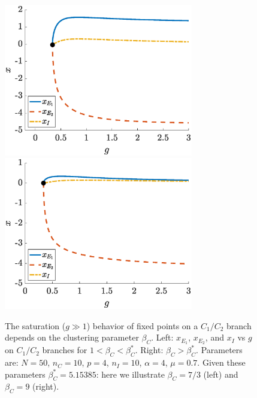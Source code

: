 \documentclass[reqno]{siamonline190516}
\begin{document}
\begin{figure}
    \centering
    \includegraphics[width=8.25cm]{clusterbeforebetacstar.eps}\hspace{-0.5cm}
    \includegraphics[width=8.25cm]{clusterafterbetacstar.eps}
    \caption{The saturation ($g \gg 1$) behavior of fixed points on a $C_1/C_2$ branch depends on the clustering parameter $\beta_C$. Left: $x_{E_1}$, $x_{E_2}$, and $x_I$ vs $g$ on $C_1/C_2$ branches for $1 < \beta_C < \beta_C^*$. Right: $\beta_C > \beta_C^*$. Parameters are: $N = 50$, $n_C = 10$, $p = 4$, $n_I = 10$, $\alpha =4$, $\mu = 0.7$. Given these parameters $\beta_C^* = 5.15385$: here we illustrate $\beta_C = 7/3$ (left) and $\beta_C = 9$ (right).}
    \label{fig:betacstar}
\end{figure}
\end{document}
